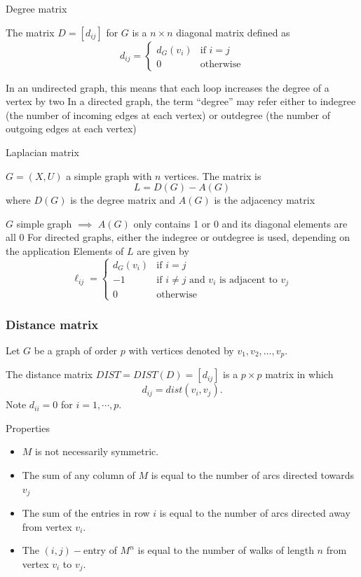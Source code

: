 \documentclass[aspectratio=43]{beamer}
\begin{document}
\begin{frame}{Degree matrix}
	\begin{definition}
		The  matrix $D=[d_{ij}]$ for $G$ is a $n \times n$ diagonal matrix defined as
		\[
			d_{ij} = \begin{cases}
				d_G(v_i) & \text{if } i = j \\
				0 & \text{otherwise}
			\end{cases}
		\]
	\end{definition}
\vfill
In an undirected graph, this means that each loop increases the degree of a vertex by two
\vfill
In a directed graph, the term ``degree'' may refer either to indegree (the number of incoming edges at each vertex) or outdegree (the number of outgoing edges at each vertex)
\end{frame}

\begin{frame}{Laplacian matrix}
\begin{definition}
	$G=(X,U)$ a simple graph with $n$ vertices. The  matrix is 
	\[
		L=D(G)-A(G)
	\]
	where $D(G)$ is the degree matrix and $A(G)$ is the adjacency matrix
\end{definition}
$G$ simple graph $\implies$ $A(G)$ only contains 1 or 0 and its diagonal elements are all 0
\vfill
For directed graphs, either the indegree or outdegree is used, depending on the application
\vfill
Elements of $L$ are given by
\[
\ell_{ij}=\begin{cases}
	d_G(v_{i}) & \text{if } i=j\\
	-1 & \text{if } i\neq j \text{ and } v_{i} 
	\text{ is adjacent to }v_{j}\\
	0 & \text{otherwise}
\end{cases}
\]
\end{frame}


\begin{frame}\frametitle{Distance matrix}
	Let $G$ be a graph of order $p$ with vertices denoted by $v_1, v_2, \dots , v_p$.
	\begin{definition}
	The distance matrix $DIST=DIST(D)=[d_{ij}]$ is a $p\times p$ matrix in which
	$$d_{ij}=
	dist(v_i,v_j).
	$$
	Note $d_{ii}=0$ for $i=1,\cdots, p$.
	\end{definition}

	\begin{definition}{Properties}
		\begin{itemize}
		\item $M$ is not necessarily symmetric.
		\item The sum of any column of $M$ is equal to the number of arcs directed towards $v_j$
		\item The sum of the entries in row $i$ is equal to the number of arcs directed away from vertex $v_i$.
		\item The $(i,j)-$entry of $M^n$ is equal to the number of walks of length $n$ from vertex $v_i$ to $v_j$.
		\end{itemize}
	\end{definition}
\end{frame}
\end{document}
